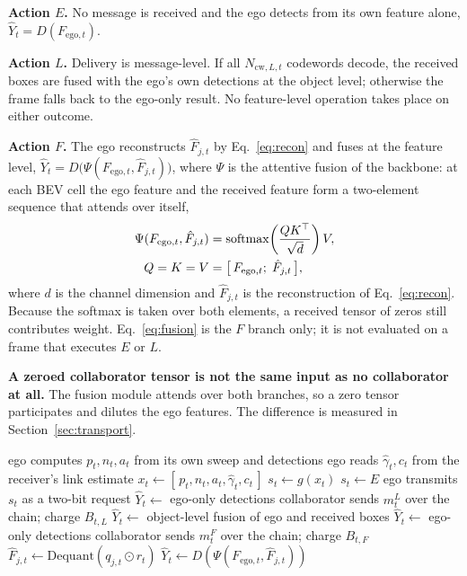 \documentclass[journal]{IEEEtran}
\begin{document}
\textbf{Action $E$.} No message is received and the ego detects from its own feature alone,
$\hat Y_t = D(F_{\mathrm{ego},t})$.

\textbf{Action $L$.} Delivery is message-level. If all $N_{\mathrm{cw},L,t}$ codewords decode, the
received boxes are fused with the ego's own detections at the object level; otherwise the frame
falls back to the ego-only result. No feature-level operation takes place on either outcome.

\textbf{Action $F$.} The ego reconstructs $\hat F_{j,t}$ by Eq.~\eqref{eq:recon} and fuses at the
feature level, $\hat Y_t = D\bigl(\Psi(F_{\mathrm{ego},t}, \hat F_{j,t})\bigr)$, where $\Psi$ is
the attentive fusion of the backbone: at each BEV cell the ego feature and the received feature
form a two-element sequence that attends over itself,
\begin{align}
\Psi(F_{\mathrm{ego},t}, \hat F_{j,t})
&= \mathrm{softmax}\!\left(\frac{QK^{\top}}{\sqrt{d}}\right) V, \notag \\
Q = K = V &= \bigl[\,F_{\mathrm{ego},t};\; \hat F_{j,t}\,\bigr],
\label{eq:fusion}
\end{align}
where $d$ is the channel dimension and $\hat F_{j,t}$ is the reconstruction of
Eq.~\eqref{eq:recon}. Because the softmax is taken over both elements, a received tensor of zeros
still contributes weight. Eq.~\eqref{eq:fusion} is the $F$ branch only; it is not evaluated on a
frame that executes $E$ or $L$.

\textbf{A zeroed collaborator tensor is not the same input as no collaborator at all.} The fusion
module attends over both branches, so a zero tensor participates and dilutes the ego features. The
difference is measured in Section~\ref{sec:transport}.

\begin{algorithm}[t]
\caption{Per-frame operation at inference}
\label{alg:infer}
\begin{algorithmic}[1]
\State ego computes $p_t, n_t, a_t$ from its own sweep and detections
\State ego reads $\hat\gamma_t, c_t$ from the receiver's link estimate
\State $x_t \gets [\,p_t, n_t, a_t, \hat\gamma_t, c_t\,]$ 
\State $s_t \gets g(x_t)$ 
  \State $s_t \gets E$ 
\EndIf
\State ego transmits $s_t$ as a two-bit request
  \State $\hat Y_t \gets$ ego-only detections 
  \State collaborator sends $m_t^L$ over the chain; charge $B_{t,L}$
    \State $\hat Y_t \gets$ object-level fusion of ego and received boxes
  \Else
    \State $\hat Y_t \gets$ ego-only detections 
  \EndIf
\Else {}
  \State collaborator sends $m_t^F$ over the chain; charge $B_{t,F}$
  \State $\hat F_{j,t} \gets \mathrm{Dequant}(q_{j,t} \odot r_t)$ 
  \State $\hat Y_t \gets D(\Psi(F_{\mathrm{ego},t}, \hat F_{j,t}))$ 
\EndIf
\end{algorithmic}
\end{algorithm}
\end{document}

